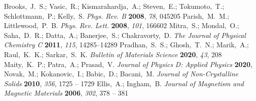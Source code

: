 \documentclass[journal=jaccck,manuscript=article]{achemso}
\begin{document}
\begin{mcitethebibliography}{16}
		Brooks,~J.~S.; Vasic,~R.; Kismarahardja,~A.; Steven,~E.; Tokumoto,~T.;
		Schlottmann,~P.; Kelly,~S. \emph{Phys. Rev. B} \textbf{2008}, \emph{78},
		045205\relax
		\mciteBstWouldAddEndPuncttrue
		\mciteSetBstMidEndSepPunct{\mcitedefaultmidpunct}
		{\mcitedefaultendpunct}{\mcitedefaultseppunct}\relax
		\EndOfBibitem
		Parish,~M.~M.; Littlewood,~P.~B. \emph{Phys. Rev. Lett.} \textbf{2008},
		\emph{101}, 166602\relax
		\mciteBstWouldAddEndPuncttrue
		\mciteSetBstMidEndSepPunct{\mcitedefaultmidpunct}
		{\mcitedefaultendpunct}{\mcitedefaultseppunct}\relax
		\EndOfBibitem
		Mitra,~S.; Mondal,~O.; Saha,~D.~R.; Datta,~A.; Banerjee,~S.; Chakravorty,~D.
		\emph{The Journal of Physical Chemistry C} \textbf{2011}, \emph{115},
		14285--14289\relax
		\mciteBstWouldAddEndPuncttrue
		\mciteSetBstMidEndSepPunct{\mcitedefaultmidpunct}
		{\mcitedefaultendpunct}{\mcitedefaultseppunct}\relax
		\EndOfBibitem
		Pradhan,~S.~S.; Ghosh,~T.~N.; Marik,~A.; Raul,~K.~K.; Sarkar,~S.~K.
		\emph{Bulletin of Materials Science} \textbf{2020}, \emph{43}, 208\relax
		\mciteBstWouldAddEndPuncttrue
		\mciteSetBstMidEndSepPunct{\mcitedefaultmidpunct}
		{\mcitedefaultendpunct}{\mcitedefaultseppunct}\relax
		\EndOfBibitem
		Maity,~K.~P.; Patra,~A.; Prasad,~V. \emph{Journal of Physics D: Applied
			Physics} \textbf{2020}, \relax
		\mciteBstWouldAddEndPunctfalse
		\mciteSetBstMidEndSepPunct{\mcitedefaultmidpunct}
		{}{\mcitedefaultseppunct}\relax
		\EndOfBibitem
		Novak,~M.; Kokanovic,~I.; Babic,~D.; Bacani,~M. \emph{Journal of
			Non-Crystalline Solids} \textbf{2010}, \emph{356}, 1725 -- 1729\relax
		\mciteBstWouldAddEndPuncttrue
		\mciteSetBstMidEndSepPunct{\mcitedefaultmidpunct}
		{\mcitedefaultendpunct}{\mcitedefaultseppunct}\relax
		\EndOfBibitem
		Ellis,~A.; Ingham,~B. \emph{Journal of Magnetism and Magnetic Materials}
		\textbf{2006}, \emph{302}, 378 -- 381\relax
		\mciteBstWouldAddEndPuncttrue
		\mciteSetBstMidEndSepPunct{\mcitedefaultmidpunct}
		{\mcitedefaultendpunct}{\mcitedefaultseppunct}\relax
		\EndOfBibitem

\end{mcitethebibliography}
\end{document}
